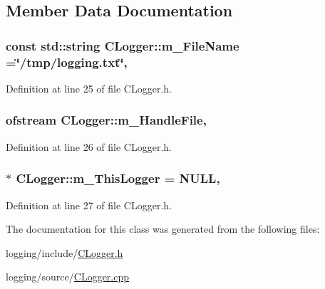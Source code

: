 \subsection{Member Data Documentation}
\hypertarget{classCLogger_acdc0bf7adf906120da7dfa947e8de31c}{
\subsubsection[{m\-\_\-\-File\-Name}]{\setlength{\rightskip}{0pt plus 5cm}const std\-::string C\-Logger\-::m\-\_\-\-File\-Name =\char`\"{}/tmp/logging.\-txt\char`\"{}\hspace{0.3cm}{\ttfamily [static]}, {\ttfamily [private]}}}\label{classCLogger_acdc0bf7adf906120da7dfa947e8de31c}


Definition at line 25 of file C\-Logger.\-h.

\hypertarget{classCLogger_af53cc92a313208f98e82e12c07c42955}{
\subsubsection[{m\-\_\-\-Handle\-File}]{\setlength{\rightskip}{0pt plus 5cm}ofstream C\-Logger\-::m\-\_\-\-Handle\-File\hspace{0.3cm}{\ttfamily [static]}, {\ttfamily [private]}}}\label{classCLogger_af53cc92a313208f98e82e12c07c42955}


Definition at line 26 of file C\-Logger.\-h.

\hypertarget{classCLogger_aff23c89f945de060b7679e01143bedc1}{
\subsubsection[{m\-\_\-\-This\-Logger}]{ $\ast$ C\-Logger\-::m\-\_\-\-This\-Logger = N\-U\-L\-L\hspace{0.3cm}{\ttfamily [static]}, {\ttfamily [private]}}}\label{classCLogger_aff23c89f945de060b7679e01143bedc1}


Definition at line 27 of file C\-Logger.\-h.



The documentation for this class was generated from the following files\-:\begin{DoxyCompactItemize}
\item 
logging/include/\hyperlink{CLogger_8h}{C\-Logger.\-h}\item 
logging/source/\hyperlink{CLogger_8cpp}{C\-Logger.\-cpp}\end{DoxyCompactItemize}
